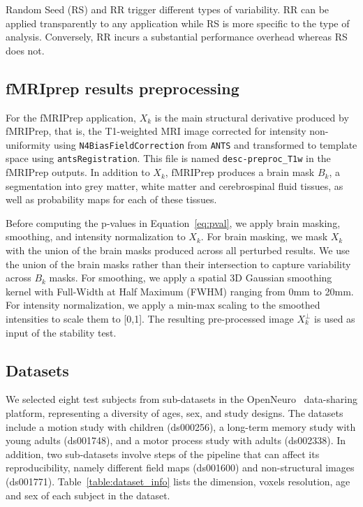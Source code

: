 \documentclass[lettersize,journal]{IEEEtran}
\newcommand{\fmriprep}{fMRIPrep\xspace}
\newcommand{\fwhm}{\textsc{FWHM}}
\begin{document}
Random Seed (RS) and RR trigger different types of variability. RR can be applied transparently to any application while RS is more specific to the type of analysis. Conversely, RR incurs a substantial performance overhead whereas RS does not.

\subsection{fMRIprep results preprocessing}

For the \fmriprep application, $X_k$ is the main structural derivative produced by \fmriprep, that is, the T1-weighted MRI image corrected for intensity non-uniformity using \texttt{N4BiasFieldCorrection} from \texttt{ANTS} and transformed to template space using \texttt{antsRegistration}. This file is named \texttt{desc-preproc\_T1w} in the \fmriprep outputs. In addition to $X_k$, \fmriprep produces a brain mask $B_k$, a segmentation into grey matter, white matter and cerebrospinal fluid tissues, as well as probability maps for each of these tissues.

Before computing the p-values in Equation~\ref{eq:pval}, we apply brain masking, smoothing, and intensity normalization to $X_k$. For brain masking, we mask $X_k$ with the union of the brain masks produced across all perturbed results. We use the union of the brain masks rather than their intersection to capture variability across $B_k$ masks. For smoothing, we apply a spatial 3D Gaussian smoothing kernel with Full-Width at Half Maximum (\fwhm) ranging from 0mm to 20mm. For intensity normalization, we apply a min-max scaling to the smoothed intensities to scale them to [0,1].
The resulting pre-processed image $X_k^\perp$ is used as input of the stability test.

\subsection{Datasets}

We selected eight test subjects from sub-datasets in the OpenNeuro~\cite{markiewicz2021openneuro} data-sharing platform, representing a diversity of ages, sex, and study designs. The datasets include a motion study with children (ds000256), a long-term memory study with young adults (ds001748), and a motor process study with adults (ds002338). In addition, two sub-datasets involve steps of the pipeline that can affect its reproducibility, namely different field maps (ds001600) and non-structural images (ds001771). Table~\ref{table:dataset_info} lists the dimension, voxels resolution, age and sex of each subject in the dataset.
\end{document}
